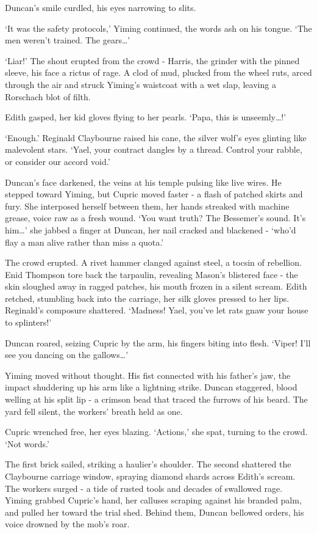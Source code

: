 Duncan's smile curdled, his eyes narrowing to slits.

`It was the safety protocols,' Yiming continued, the words ash on his tongue. `The men weren't trained. The gears\dots'

`Liar!' The shout erupted from the crowd - Harris, the grinder with the pinned sleeve, his face a rictus of rage. A clod of mud, plucked from the wheel ruts, arced through the air and struck Yiming's waistcoat with a wet slap, leaving a Rorschach blot of filth.

Edith gasped, her kid gloves flying to her pearls. `Papa, this is unseemly\dots!'

`Enough.' Reginald Claybourne raised his cane, the silver wolf's eyes glinting like malevolent stars. `Yael, your contract dangles by a thread. Control your rabble, or consider our accord void.'

Duncan's face darkened, the veins at his temple pulsing like live wires. He stepped toward Yiming, but Cupric moved faster - a flash of patched skirts and fury. She interposed herself between them, her hands streaked with machine grease, voice raw as a fresh wound. `You want truth? The Bessemer's sound. It's him\dots' she jabbed a finger at Duncan, her nail cracked and blackened - `who'd flay a man alive rather than miss a quota.'

The crowd erupted. A rivet hammer clanged against steel, a tocsin of rebellion. Enid Thompson tore back the tarpaulin, revealing Mason's blistered face - the skin sloughed away in ragged patches, his mouth frozen in a silent scream. Edith retched, stumbling back into the carriage, her silk gloves pressed to her lips. Reginald's composure shattered. `Madness! Yael, you've let rats gnaw your house to splinters!'

Duncan roared, seizing Cupric by the arm, his fingers biting into flesh. `Viper! I'll see you dancing on the gallows\dots'

Yiming moved without thought. His fist connected with his father's jaw, the impact shuddering up his arm like a lightning strike. Duncan staggered, blood welling at his split lip - a crimson bead that traced the furrows of his beard. The yard fell silent, the workers' breath held as one.

Cupric wrenched free, her eyes blazing. `Actions,' she spat, turning to the crowd. `Not words.'

The first brick sailed, striking a haulier's shoulder. The second shattered the Claybourne carriage window, spraying diamond shards across Edith's scream. The workers surged - a tide of rusted tools and decades of swallowed rage. Yiming grabbed Cupric's hand, her calluses scraping against his branded palm, and pulled her toward the trial shed. Behind them, Duncan bellowed orders, his voice drowned by the mob's roar.

